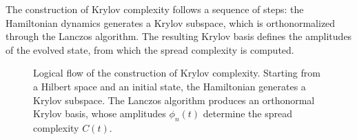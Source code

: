 \documentclass[11pt]{article}
\begin{document}
\bigskip
%

The construction of Krylov complexity follows a sequence of steps:
the Hamiltonian dynamics generates a Krylov subspace, which is
orthonormalized through the Lanczos algorithm. The resulting Krylov
basis defines the amplitudes of the evolved state, from which the
spread complexity is computed.

\begin{figure}[ht]
\centering


\caption{
Logical flow of the construction of Krylov complexity.
Starting from a Hilbert space and an initial state, the Hamiltonian
generates a Krylov subspace. The Lanczos algorithm produces an
orthonormal Krylov basis, whose amplitudes $\phi_n(t)$ determine the
spread complexity $C(t)$.
}

\label{fig:flowchart}

\end{figure}
\end{document}

